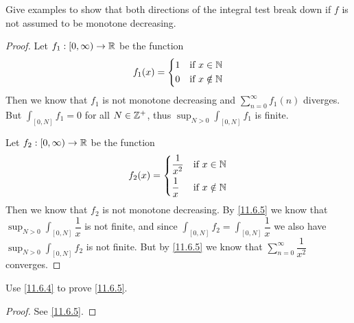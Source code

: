 \begin{ex}\label{ex:11.6.4}
  Give examples to show that both directions of the integral test break down if \(f\) is not assumed to be monotone decreasing.
\end{ex}

\begin{proof}
  Let \(f_1 : [0, \infty) \to \mathbb{R}\) be the function
  \[
    f_1(x) = \begin{dcases}
      1 & \text{if } x \in \mathbb{N}    \\
      0 & \text{if } x \notin \mathbb{N}
    \end{dcases}
  \]
  Then we know that \(f_1\) is not monotone decreasing and \(\sum_{n = 0}^\infty f_1(n)\) diverges.
  But \(\int_{[0, N]} f_1 = 0\) for all \(N \in \mathbb{Z}^+\), thus \(\sup_{N > 0} \int_{[0, N]} f_1\) is finite.

  Let \(f_2 : [0, \infty) \to \mathbb{R}\) be the function
  \[
    f_2(x) = \begin{dcases}
      \dfrac{1}{x^2} & \text{if } x \in \mathbb{N}    \\
      \dfrac{1}{x}   & \text{if } x \notin \mathbb{N}
    \end{dcases}
  \]
  Then we know that \(f_2\) is not monotone decreasing.
  By \cref{11.6.5} we know that \(\sup_{N > 0} \int_{[0, N]} \dfrac{1}{x}\) is not finite, and since \(\int_{[0, N]} f_2 = \int_{[0, N]} \dfrac{1}{x}\) we also have \(\sup_{N > 0} \int_{[0, N]} f_2\) is not finite.
  But by \cref{11.6.5} we know that \(\sum_{n = 0}^\infty \dfrac{1}{x^2}\) converges.
\end{proof}

\begin{ex}\label{ex:11.6.5}
  Use \cref{11.6.4} to prove \cref{11.6.5}.
\end{ex}

\begin{proof}
  See \cref{11.6.5}.
\end{proof}